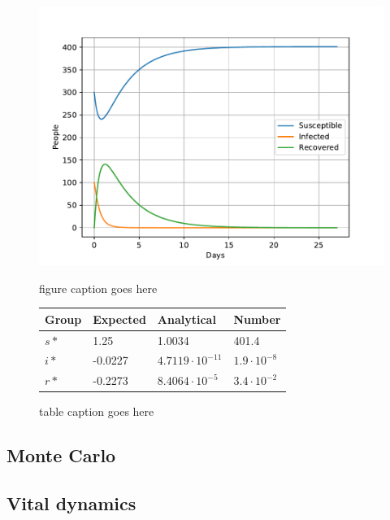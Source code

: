 \documentclass[a4paper]{article}
\let\Oldsubsection\subsection
\renewcommand{\subsection}{\FloatBarrier\Oldsubsection}
\begin{document}
\begin{figure}
	\centering
	\begin{minipage}{0.49\textwidth}
		\centering
		\includegraphics[scale=0.6]{../plots/opp_a_E.pdf}
		\caption{figure caption goes here}\label{fig:opp_a_E}
	\end{minipage}
	\begin{minipage}{0.49\textwidth}
		\centering
		\captionsetup{type=table} %
		\begin{tabular}{|l|l|l|l|}
			\hline
			Group & Expected & Analytical   & Number  \\ \hline
			$s*$ & 1.25 & 1.0034 & 401.4 \\ \hline
			$i*$ & -0.0227 & $4.7119\cdot 10^{-11}$ & $1.9\cdot 10^{-8}$ \\ \hline
			$r*$ & -0.2273 & $8.4064\cdot 10^{-5}$ & $3.4\cdot 10^{-2}$ \\ \hline
		\end{tabular}
		\caption{table caption goes  here}\label{tab:opp_a_E}
	\end{minipage}
\end{figure}


\subsection{Monte Carlo}


\subsection{Vital dynamics}
\end{document}
